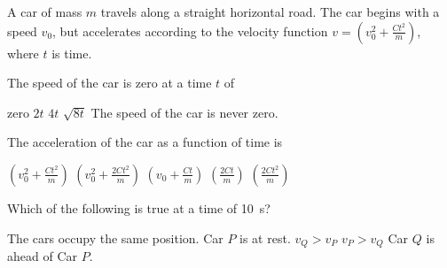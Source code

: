 \documentclass{../../../oss-classkick-exam}
\begin{document}
\begin{multicols*}{2}
\begin{questions}
{      A car of mass $m$ travels along a straight horizontal road. The car begins
      with a speed $v_0$, but accelerates according to the velocity function
      $\displaystyle v=\left(v_0^2+\frac{Ct^2}{m}\right)$, where $t$ is time.
    }

    \question The speed of the car is zero at a time $t$ of
    \begin{choices}
      \choice zero
      \choice $2t$
      \choice $4t$
      \choice $\sqrt{8t}$
      \choice The speed of the car is never zero.
    \end{choices}
    \vspace{.7in}
    \label{car1}
    
    \question The acceleration of the car as a function of time is
    \begin{choices}
      \choice $\displaystyle\left(v_0^2+\frac{Ct^2}{m}\right)$
      \choice $\displaystyle\left(v_0^2+\frac{2Ct^2}{m}\right)$
      \choice $\displaystyle\left(v_0+\frac{Ct}{m}\right)$
      \choice $\displaystyle\left(\frac{2Ct}{m}\right)$
      \choice $\displaystyle\left(\frac{2Ct^2}{m}\right)$
    \end{choices}
    \label{car2}
    \columnbreak
  
    
    \question Which of the following is true at a time of \SI{10}{\second}?
    \begin{choices}
      \choice The cars occupy the same position.
      \choice Car $P$ is at rest.
      \choice $v_Q>v_P$
      \choice $v_P>v_Q$
      \choice Car $Q$ is ahead of Car $P$.
    \end{choices}
    \label{q:graph1}
    \vspace{.7in}
    

\end{questions}
\end{multicols*}
\end{document}
